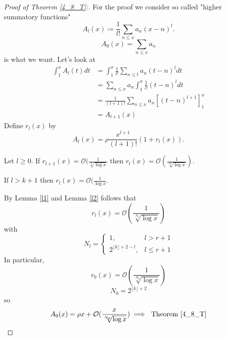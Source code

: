 \documentclass[NumTh.tex]{subfiles}
\begin{document}
\begin{proof}[Proof of Theorem \ref{4_8_T}:]
  For the proof we consider so called "higher summatory functions"
  \[ A_l(x) \coloneq \frac{1}{l!} \sum_{n \leq x} a_n (x-n)^l \text{.} \]
  \[ A_0(x) = \sum_{n \leq x} a_n \]
  is what we want.
  Let's look at
  \begin{align*}
    \int_1^x A_l(t) dt &= \int_1^x \frac{1}{l!} \sum_{n \leq t} a_n ( t-n)^l dt \\
    &= \sum_{n \leq x} a_n \int_1^x \frac{1}{l!} (t-n)^l dt \\
    &= \frac{1}{(l+1)!} \sum_{n \leq x} a_n [(t-n)^{l+1}]_1^x \\
    &= A_{l+1}(x)
  \end{align*}
  Define $r_l(x)$ by 
  \[ A_l(x) = \rho \frac{x^{l+1}}{(l+1)!} (1 + r_l(x)) \text{.} \]
  \begin{lemma}\label{l1}
    Let $l \geq 0$. If $r_{l+1}(x) = \mathcal{O}(\frac{1}{\sqrt[N]{\log x}}$ then $r_l(x) = \mathcal{O}( \frac{1}{\sqrt[2N]{\log x}})$.
  \end{lemma}
  \begin{lemma}\label{l2}
    If $l > k+1$ then $r_l(x) = \mathcal{O}( \frac{1}{\log x}$.
  \end{lemma}
  By Lemma \ref{l1} and Lemma \ref{l2} follows that
  \[ r_l(x) = \mathcal{O}(\frac{1}{\sqrt[N_l]{\log x}})\]
  with 
  \[ N_l = \begin{cases}
    1, & l > r + 1 \\
    2^{\lfloor k \rfloor + 2 - l}, & l \leq r+1
  \end{cases} \]
  In particular, 
  \[ r_0(x) = \mathcal{O}(\frac{1}{\sqrt[N_0]{\log x}}) \]
  \[ N_0 = 2^{\lfloor k \rfloor + 2} \]
  so 
  \[ A_0(x) = \rho x + \mathcal{O}(\frac{x}{\sqrt[N_0]{\log x}}) \implies \text{ Theorem \ref{4_8_T}} \]
\end{proof}
\end{document}
